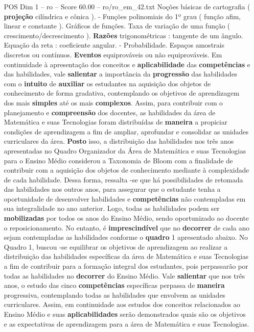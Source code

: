 \begin{textsample}{POS Dim 1 – ro – Score 60.00 – ro/ro\_em\_42.txt}
Noções básicas de cartografia ( \textbf{projeção} cilíndrica e cônica ). - Funções polinomiais do 1º grau ( função afim, linear e constante ).
Gráficos de funções.
Taxa de variação de uma função ( crescimento/decrescimento ). \textbf{Razões} trigonométricas : tangente de um ângulo.
Equação da reta : coeficiente angular. - Probabilidade.
Espaços amostrais discretos ou contínuos. \textbf{Eventos} equiprováveis ou não equiprováveis.
Em continuidade à apresentação dos conceitos e \textbf{aplicabilidade} das \textbf{competências} e das habilidades, vale \textbf{salientar} a importância da \textbf{progressão} das habilidades com o \textbf{intuito} de \textbf{auxiliar} os estudantes na aquisição dos objetos de conhecimento de forma gradativa, contemplando os objetivos de aprendizagem dos mais \textbf{simples} até os mais \textbf{complexos}.
Assim, para contribuir com o planejamento e \textbf{compreensão} dos docentes, as habilidades da área de Matemática e suas Tecnologias foram distribuídas de \textbf{maneira} a propiciar condições de aprendizagem a fim de ampliar, aprofundar e consolidar as unidades curriculares da área. \textbf{Posto} isso, a distribuição das habilidades nos três anos apresentadas no Quadro Organizador da Área de Matemática e suas Tecnologias para o Ensino Médio considerou a Taxonomia de Bloom com a finalidade de contribuir com a aquisição dos objetos de conhecimento mediante à complexidade de cada habilidade.
Dessa forma, ressalta -se que há possibilidades de retomada das habilidades nos outros anos, para assegurar que o estudante tenha a oportunidade de desenvolver habilidades e \textbf{competências} não contempladas em sua integralidade no ano anterior.
Logo, todas as habilidades podem ser \textbf{mobilizadas} por todos os anos do Ensino Médio, sendo oportunizado ao docente o reposicionamento.
No entanto, é \textbf{imprescindível} que no \textbf{decorrer} de cada ano sejam contempladas as habilidades conforme o \textbf{quadro} 1 apresentado abaixo.
No Quadro 1, buscou -se equilibrar os objetivos de aprendizagem ao realizar a distribuição das habilidades específicas da área de Matemática e suas Tecnologias a fim de contribuir para a formação integral dos estudantes, pois perpassarão por todas as habilidades no \textbf{decorrer} do Ensino Médio.
Vale \textbf{salientar} que nos três anos, o estudo das cinco \textbf{competências} específicas perpassa de \textbf{maneira} progressiva, contemplando todas as habilidades que envolvem as unidades curriculares.
Assim, em continuidade aos estudos dos conceitos relacionados ao Ensino Médio e suas \textbf{aplicabilidades} serão demonstrados quais são os objetivos e as expectativas de aprendizagem para a área de Matemática e suas Tecnologias.


\end{textsample}
